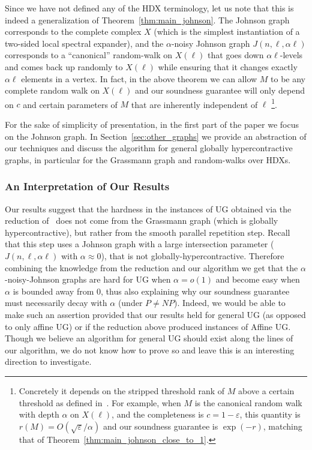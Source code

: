 \documentclass[11pt]{article}
\def \eps {{\varepsilon}}
\theoremstyle{definition}
\begin{document}
Since we have not defined any of the HDX terminology, let us note that this is indeed a generalization of Theorem~\ref{thm:main_johnson}. The Johnson graph corresponds to the complete complex $X$ (which is the simplest instantiation of a two-sided local spectral expander), and the $\alpha$-noisy Johnson graph $J(n,\ell,\alpha\ell)$ corresponds to a ``canonical'' random-walk on $X(\ell)$ that goes down $\alpha\ell$-levels and comes back up randomly to $X(\ell)$ while ensuring that it changes exactly $\alpha\ell$ elements in a vertex. In fact, in the above theorem we can allow $M$ to be any complete random walk on $X(\ell)$ and our soundness guarantee will only depend on $c$ and certain parameters of $M$ that are inherently independent of $\ell$ \footnote{Concretely it depends on the stripped threshold rank of $M$ above a certain threshold as defined in~\cite{DBLP:conf/soda/BafnaHKL22}. For example, when $M$ is the canonical random walk with depth $\alpha$ on $X(\ell)$, and the completeness is $c=1-\eps$, this quantity is $r(M) = O(\sqrt{\eps}/\alpha)$ and our soundness guarantee is $\exp(-r)$, matching that of Theorem~\ref{thm:main_johnson_close_to_1}.}. 


For the sake 
of simplicity of presentation, in the first part of the paper we focus
on the Johnson graph. In Section~\ref{sec:other_graphs} we provide an abstraction of our techniques and discuss the algorithm for general globally hypercontractive graphs, in particular for the Grassmann graph and random-walks over HDXs.


\subsubsection*{An Interpretation of Our Results}\label{sec:interpretation}
Our results suggest that the hardness in 
the instances of UG obtained via the reduction  of~\cite{KhotMS17,DBLP:conf/stoc/DinurKKMS18a,DinurKKMS18,KhotMS18} does not come from
the Grassmann graph (which is globally 
hypercontractive), but rather from the smooth parallel repetition step. Recall that this step uses a Johnson graph with a large intersection
parameter ($J(n,\ell,\alpha\ell)$ with $\alpha \approx 0$), that is not globally-hypercontractive. Therefore combining the knowledge from the reduction and our algorithm we get that the $\alpha$-noisy-Johnson graphs are hard for UG when $\alpha = o(1)$ and become easy when $\alpha$ is bounded away from $0$, thus also explaining why our soundness guarantee must necessarily decay with $\alpha$ (under $P \neq NP$). Indeed, we would be able to make such an assertion provided that our
results held for general UG (as opposed to only affine UG) or if the reduction above produced  instances of Affine UG. Though
we believe an algorithm for general UG should exist along the lines of our algorithm, we 
do not know how to prove so and leave this is 
an interesting direction to investigate. 
\end{document}
